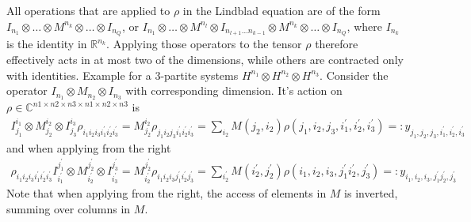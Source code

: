 \documentclass[letterpaper]{article}
\newcommand{\R}{\mathds{R}}
\newcommand{\C}{\mathds{C}}
\newcommand{\p}{\prime}
\begin{document}
All operations that are applied to $\rho$ in the Lindblad equation are of the
form $I_{n_1}\otimes \dots \otimes M^{n_k} \otimes \dots \otimes I_{n_Q}$, or
$I_{n_1}\otimes \dots \otimes M^{n_l} \otimes I_{n_{l+1}\dots n_{k-1}} \otimes
M^{n_k} \otimes \dots \otimes I_{n_Q}$, where $I_{n_k}$ is the identity in
$\R^{n_k}$. Applying those operators to the tensor $\rho$ therefore effectively
acts in at most two of the dimensions, while others are contracted only with
identities. Example for a 3-partite systems $H^{n_1} \otimes H^{n_2} \otimes
H^{n_3}$. Consider the operator $I_{n_1} \otimes M_{n_2} \otimes I_{n_3}$ with
corresponding dimension. It's action on $\rho \in \C^{n1\times n2\times n3
\times n1\times n2 \times n3}$ is
\begin{align}
    I^{i_1}_{j_1}\otimes M^{i_2}_{j_2} \otimes I^{i_3}_{j_3}
    \rho_{i_1i_2i_3i_1^{\prime}i_2^\prime i_3^\prime} = M^{i_2}_{j_2}
    \rho_{j_1i_2j_3i_1^{\prime}i_2^\prime i_3^\prime} = \sum_{i_2} M(j_2, i_2)
    \rho(j_1,i_2,j_3,i_1^{\prime},i_2^\prime, i_3^\prime)  =:
    y_{j_1,j_2,j_3,i_1^{\prime},i_2^\prime,i_3^\prime}
\end{align}
and when applying from the right
\begin{align}
    \rho_{i_1i_2i_3i_1^{\prime}i_2^\prime
    i_3^\prime}I^{j_1^{\prime}}_{i_1^\p}\otimes M^{j_2^\prime}_{i_2^\p} \otimes
    I^{j_3^\prime}_{i_3^\p}  = M^{j_2^\prime}_{i_2^\prime}
    \rho_{i_1i_2i_3j_1^{\prime}i_2^\prime j_3^\prime} = \sum_{i_2^\prime}
    M(i_2^{\prime}, j_2^\prime) \rho(i_1,i_2,i_3,j_1^{\prime}i_2^\prime,
    j_3^\prime)  =: y_{i_1,i_2,i_3,j_1^{\prime}j_2^\prime, j_3^\prime}
\end{align}
Note that when applying from the right, the access of elements in $M$ is
inverted, summing over columns in $M$.
\end{document}
